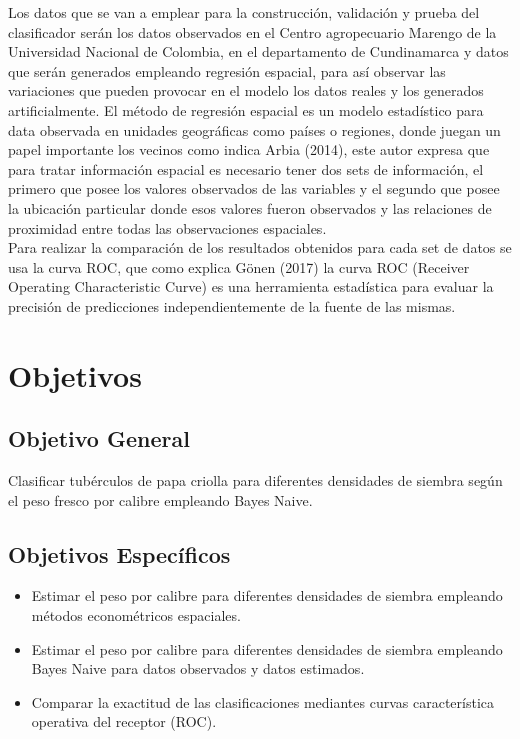 Los datos que se van a emplear para la construcción, validación y prueba del clasificador serán los datos observados en el Centro agropecuario Marengo de la Universidad Nacional de Colombia, en el departamento de Cundinamarca y datos que serán generados empleando regresión espacial, para así observar las variaciones que pueden provocar en el modelo los datos reales y los generados artificialmente. El método de regresión espacial es un modelo estadístico para data observada en unidades geográficas como países o regiones, donde juegan un papel importante los vecinos como indica Arbia (2014), este autor expresa que para tratar información espacial es necesario tener dos sets de información, el primero que posee los valores observados de las variables y el segundo que posee la ubicación particular donde esos valores fueron observados y las relaciones de proximidad entre todas las observaciones espaciales.\\

Para realizar la comparación de los resultados obtenidos para cada set de datos se usa la curva ROC, que como explica Gönen (2017) la curva ROC (Receiver Operating Characteristic Curve) es una herramienta estadística para evaluar la precisión de predicciones independientemente de la fuente de las mismas.

\section{Objetivos}

\subsection{Objetivo General}

Clasificar tubérculos de papa criolla para diferentes densidades de siembra según el peso fresco por calibre empleando Bayes Naive.

\subsection{Objetivos Espec\'ificos}
 
\begin{itemize}
\item  Estimar el peso por calibre para diferentes densidades de siembra empleando métodos econométricos espaciales.
\item	 Estimar el peso por calibre para diferentes densidades de siembra empleando Bayes Naive para datos observados y datos estimados.
\item  Comparar la exactitud de las clasificaciones mediantes curvas característica operativa del receptor (ROC).
\end{itemize}

